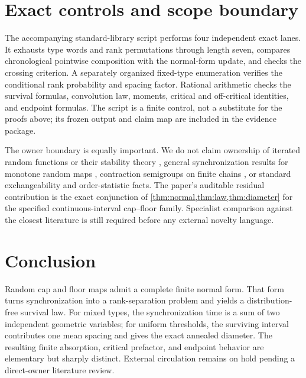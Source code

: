 \documentclass[11pt,a4paper]{amsart}
\theoremstyle{definition}
\theoremstyle{remark}
\begin{document}
\section{Exact controls and scope boundary}

The accompanying standard-library script performs four independent exact
lanes.  It exhausts type words and rank permutations through length seven,
compares chronological pointwise composition with the normal-form update,
and checks the crossing criterion.  A separately organized fixed-type
enumeration verifies the conditional rank probability and spacing factor.
Rational arithmetic checks the survival formulas, convolution law, moments,
critical and off-critical identities, and endpoint formulas.  The script is
a finite control, not a substitute for the proofs above; its frozen output
and claim map are included in the evidence package.

The owner boundary is equally important.  We do not claim ownership of
iterated random functions or their stability theory
\cite{DiaconisFreedman1999}, general synchronization results for monotone
random maps \cite{MatiasSilva2021}, contraction semigroups on finite chains
\cite{Umar2021}, or standard exchangeability and order-statistic facts.  The
paper's auditable residual contribution is the exact conjunction of
\cref{thm:normal,thm:law,thm:diameter} for the specified continuous-interval
cap--floor family.  Specialist comparison against the closest literature
is still required before any external novelty language.

\section{Conclusion}

Random cap and floor maps admit a complete finite normal form.  That form
turns synchronization into a rank-separation problem and yields a
distribution-free survival law.  For mixed types, the synchronization time
is a sum of two independent geometric variables; for uniform thresholds,
the surviving interval contributes one mean spacing and gives the exact
annealed diameter.  The resulting finite absorption, critical prefactor,
and endpoint behavior are elementary but sharply distinct.  External
circulation remains on hold pending a direct-owner literature review.



\end{document}
